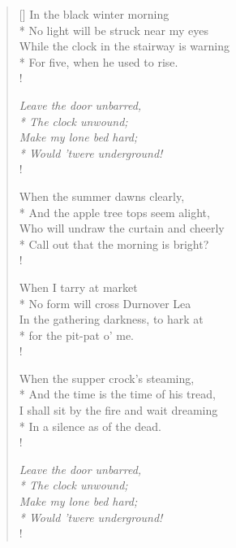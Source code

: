 \documentclass[MAIN]{subfiles}
\begin{document}
\settowidth{\versewidth}{While the clock in the stairway is warning}
\begin{verse}[\versewidth]
In the black winter morning\\* 
\vin No light will be struck near my eyes\\
While the clock in the stairway is warning\\*
\vin For five, when he used to rise.\\!

{\it Leave the door unbarred,\\*
\vin The clock unwound;\\
Make my lone bed hard;\\*
\vin Would 'twere underground!}\\!

When the summer dawns clearly,\\*
\vin And the apple tree tops seem alight,\\
Who will undraw the curtain and cheerly\\*
\vin Call out that the morning is bright?\\!

When I tarry at market\\*
\vin No form will cross {\sc Durnover Lea}\\
In the gathering darkness, to hark at\\*
 for the pit-pat o' me.\\!

When the supper crock's steaming,\\*
\vin And the time is the time of his tread,\\
I shall sit by the fire and wait dreaming\\*
\vin In a silence as of the dead.\\!

{\it Leave the door unbarred,\\*
\vin The clock unwound;\\
Make my lone bed hard;\\*
\vin Would 'twere underground!}\\!
\end{verse}
\end{document}
